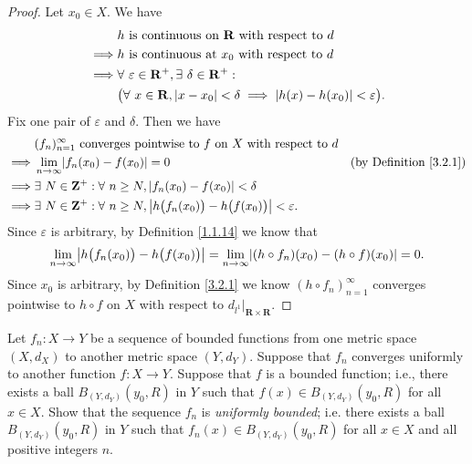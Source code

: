 \begin{proof}
    Let \(x_0 \in X\).
    We have
    \begin{align*}
                 & h \text{ is continuous on } \mathbf{R} \text{ with respect to } d                                         \\
        \implies & h \text{ is continuous at } x_0 \text{ with respect to } d                                                \\
        \implies & \forall\ \varepsilon \in \mathbf{R}^+, \exists\ \delta \in \mathbf{R}^+ :                                 \\
                 & \big(\forall\ x \in \mathbf{R}, \abs*{x - x_0} < \delta \implies \abs*{h(x) - h(x_0)} < \varepsilon\big).
    \end{align*}
    Fix one pair of \(\varepsilon\) and \(\delta\).
    Then we have
    \begin{align*}
                 & (f_n)_{n = 1}^\infty \text{ converges pointwise to } f \text{ on } X \text{ with respect to } d                                                     \\
        \implies & \lim_{n \to \infty} \abs*{f_n(x_0) - f(x_0)} = 0                                                               & \text{(by Definition \ref{3.2.1})} \\
        \implies & \exists\ N \in \mathbf{Z}^+ : \forall\ n \geq N, \abs*{f_n(x_0) - f(x_0)} < \delta                                                                  \\
        \implies & \exists\ N \in \mathbf{Z}^+ : \forall\ n \geq N, \abs*{h\big(f_n(x_0)\big) - h\big(f(x_0)\big)} < \varepsilon.
    \end{align*}
    Since \(\varepsilon\) is arbitrary, by Definition \ref{1.1.14} we know that
    \[
        \lim_{n \to \infty} \abs*{h\big(f_n(x_0)\big) - h\big(f(x_0)\big)} = \lim_{n \to \infty} \abs*{(h \circ f_n)(x_0) - (h \circ f)(x_0)} = 0.
    \]
    Since \(x_0\) is arbitrary, by Definition \ref{3.2.1} we know \((h \circ f_n)_{n = 1}^\infty\) converges pointwise to \(h \circ f\) on \(X\) with respect to \(d_{l^1}|_{\mathbf{R} \times \mathbf{R}}\).
\end{proof}

\begin{exercise}\label{ex 3.2.4}
    Let \(f_n : X \to Y\) be a sequence of bounded functions from one metric space \((X, d_X)\) to another metric space \((Y, d_Y)\).
    Suppose that \(f_n\) converges uniformly to another function \(f : X \to Y\).
    Suppose that \(f\) is a bounded function;
    i.e., there exists a ball \(B_{(Y, d_Y)}(y_0, R)\) in \(Y\) such that \(f(x) \in B_{(Y, d_Y)}(y_0, R)\) for all \(x \in X\).
    Show that the sequence \(f_n\) is \emph{uniformly bounded};
    i.e. there exists a ball \(B_{(Y, d_Y)}(y_0, R)\) in \(Y\) such that \(f_n(x) \in B_{(Y, d_Y)}(y_0, R)\) for all \(x \in X\) and all positive integers \(n\).
\end{exercise}